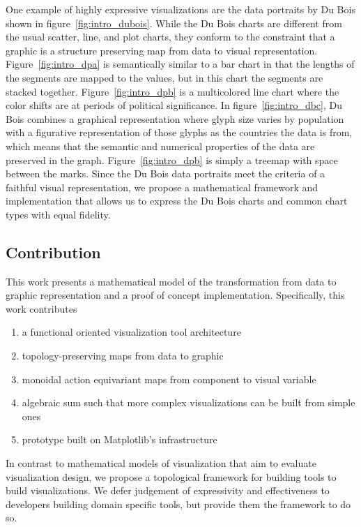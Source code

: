 \documentclass[../main.tex]{subfiles}
\begin{document}
One example of highly expressive visualizations are the data portraits by Du Bois shown in figure~\ref{fig:intro_dubois}. While the Du Bois charts are different from the usual scatter, line, and plot charts, they conform to the constraint that a graphic is a structure preserving map from data to visual representation. Figure~\ref{fig:intro_dpa} is semantically similar to a bar chart in that the lengths of the segments are mapped to the values, but in this chart the segments are stacked together. Figure~\ref{fig:intro_dpb} is a multicolored line chart where the color shifts are at periods of political significance. In figure~\ref{fig:intro_dbc}, Du Bois combines a graphical representation where glyph size varies by population with a figurative representation of those glyphs as the countries the data is from, which means that the semantic and numerical properties of the data are preserved in the graph. Figure~\ref{fig:intro_dpb} is simply a treemap\cite{heerTourVisualizationZoo2010} with space between the marks. Since the Du Bois data portraits meet the criteria of a faithful visual representation, we propose a mathematical framework and implementation that allows us to express the Du Bois charts and common chart types with equal fidelity. 

\subsection{Contribution}
This work presents a mathematical model of the transformation from data to graphic representation and a proof of concept implementation. Specifically, this work contributes

\begin{enumerate}
    \item a functional oriented visualization tool architecture
    \item topology-preserving maps from data to graphic 
    \item monoidal action equivariant maps from component to visual variable 
    \item algebraic sum such that more complex visualizations can be built from simple ones 
    \item prototype built on Matplotlib's infrastructure
\end{enumerate}
In contrast to mathematical models of visualization that aim to evaluate visualization design, we propose a topological framework for building tools to build visualizations. We defer judgement of expressivity and effectiveness to developers building domain specific tools, but provide them the framework to do so. 
\end{document}
